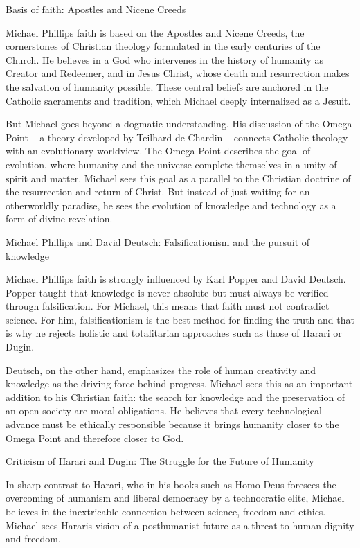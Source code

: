 \documentclass[
]{article}
\begin{document}
Basis of faith: Apostles\textquotesingle{} and Nicene Creeds

Michael Phillips\textquotesingle{} faith is based on the
Apostles\textquotesingle{} and Nicene Creeds, the cornerstones of
Christian theology formulated in the early centuries of the Church. He
believes in a God who intervenes in the history of humanity as Creator
and Redeemer, and in Jesus Christ, whose death and resurrection makes
the salvation of humanity possible. These central beliefs are anchored
in the Catholic sacraments and tradition, which Michael deeply
internalized as a Jesuit.

But Michael goes beyond a dogmatic understanding. His discussion of the
Omega Point -- a theory developed by Teilhard de Chardin -- connects
Catholic theology with an evolutionary worldview. The Omega Point
describes the goal of evolution, where humanity and the universe
complete themselves in a unity of spirit and matter. Michael sees this
goal as a parallel to the Christian doctrine of the resurrection and
return of Christ. But instead of just waiting for an otherworldly
paradise, he sees the evolution of knowledge and technology as a form of
divine revelation.

Michael Phillips and David Deutsch: Falsificationism and the pursuit of
knowledge

Michael Phillips\textquotesingle{} faith is strongly influenced by Karl
Popper and David Deutsch. Popper taught that knowledge is never absolute
but must always be verified through falsification. For Michael, this
means that faith must not contradict science. For him, falsificationism
is the best method for finding the truth and that is why he rejects
holistic and totalitarian approaches such as those of Harari or Dugin.

Deutsch, on the other hand, emphasizes the role of human creativity and
knowledge as the driving force behind progress. Michael sees this as an
important addition to his Christian faith: the search for knowledge and
the preservation of an open society are moral obligations. He believes
that every technological advance must be ethically responsible because
it brings humanity closer to the Omega Point and therefore closer to
God.

Criticism of Harari and Dugin: The Struggle for the Future of Humanity

In sharp contrast to Harari, who in his books such as Homo Deus foresees
the overcoming of humanism and liberal democracy by a technocratic
elite, Michael believes in the inextricable connection between science,
freedom and ethics. Michael sees Harari\textquotesingle s vision of a
posthumanist future as a threat to human dignity and freedom.
\end{document}
